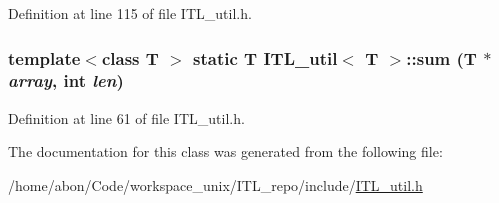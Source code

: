 Definition at line 115 of file ITL\_\-util.h.

\hypertarget{classITL__util_aad5bdd0ab06d36d4119e05ec2786005b}{
\subsubsection[{sum}]{\setlength{\rightskip}{0pt plus 5cm}template$<$class T $>$ static T {\bf ITL\_\-util}$<$ T $>$::sum (T $\ast$ {\em array}, \/  int {\em len})}}
\label{classITL__util_aad5bdd0ab06d36d4119e05ec2786005b}


Definition at line 61 of file ITL\_\-util.h.



The documentation for this class was generated from the following file:\begin{DoxyCompactItemize}
\item 
/home/abon/Code/workspace\_\-unix/ITL\_\-repo/include/\hyperlink{ITL__util_8h}{ITL\_\-util.h}\end{DoxyCompactItemize}

